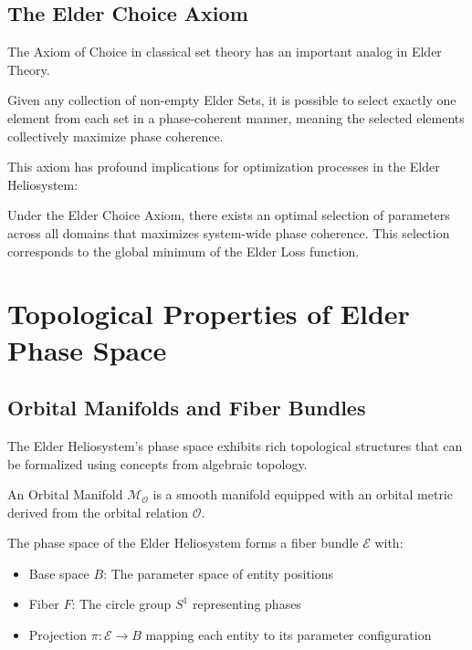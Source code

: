 \begin{theorem}
\begin{definition}
\begin{definition}
\begin{enumerate}
\begin{definition}
\subsection{The Elder Choice Axiom}

The Axiom of Choice in classical set theory has an important analog in Elder Theory.

\begin{axiom}
Given any collection of non-empty Elder Sets, it is possible to select exactly one element from each set in a phase-coherent manner, meaning the selected elements collectively maximize phase coherence.
\end{axiom}

This axiom has profound implications for optimization processes in the Elder Heliosystem:

\begin{theorem}
Under the Elder Choice Axiom, there exists an optimal selection of parameters across all domains that maximizes system-wide phase coherence. This selection corresponds to the global minimum of the Elder Loss function.
\end{theorem}

\section{Topological Properties of Elder Phase Space}

\subsection{Orbital Manifolds and Fiber Bundles}

The Elder Heliosystem's phase space exhibits rich topological structures that can be formalized using concepts from algebraic topology.

\begin{definition}
An Orbital Manifold $\mathcal{M}_{\mathcal{O}}$ is a smooth manifold equipped with an orbital metric derived from the orbital relation $\mathcal{O}$.
\end{definition}

\begin{theorem}
The phase space of the Elder Heliosystem forms a fiber bundle $\mathcal{E}$ with:
\begin{itemize}
    \item Base space $B$: The parameter space of entity positions
    \item Fiber $F$: The circle group $S^1$ representing phases
    \item Projection $\pi: \mathcal{E} \to B$ mapping each entity to its parameter configuration
\end{itemize}
\end{theorem}


\end{definition}
\end{enumerate}
\end{definition}
\end{definition}
\end{theorem}
